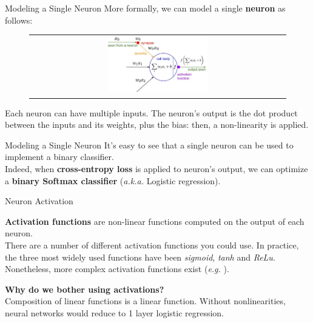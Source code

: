 \documentclass[aspectratio=169]{beamer}
\begin{document}

\begin{frame}{Modeling a Single Neuron}
More formally, we can model a single \textbf{neuron} as follows:
\begin{figure}
\begin{tabular}{c}
\includegraphics[width=0.4\textwidth]{img/dnn/single_neuron.jpg}
\end{tabular}
\end{figure}
Each neuron can have multiple inputs. The neuron's output is the dot product between the inputs and its weights, plus the bias: then, a non-linearity is applied.
\end{frame}


\begin{frame}{Modeling a Single Neuron}
It's easy to see that a single neuron can be used to implement a binary classifier.\\
\vspace{1cm}
Indeed, when \textbf{cross-entropy loss} is applied to neuron's output, we can optimize a \textbf{binary Softmax classifier} (\emph{a.k.a.} Logistic regression).
\end{frame}


\begin{frame}{Neuron Activation}

\textbf{Activation functions} are non-linear functions computed on the output of each neuron.\\
There are a number of different activation functions you could use. In practice, the three most widely used functions have been \textit{sigmoid}, \textit{tanh} and \textit{ReLu}. Nonetheless, more complex activation functions exist (\emph{e.g.} \cite{he2015delving,goodfellow2013maxout}).

\textbf{Why do we bother using activations?}\\
\pause
Composition of linear functions is a linear function. Without nonlinearities, neural networks would reduce to 1 layer logistic regression.


\end{frame}
\end{document}
